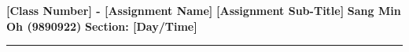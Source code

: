 \documentclass[12pt]{article}
\begin{document}
\begin{flushleft}
{{\Large\textbf{[Class Number] - [Assignment Name]}}\newline
{\large\textbf{[Assignment Sub-Title]}}\newline
\vspace{-7pt}\newline
{\large\textbf{Sang Min Oh (9890922)}}\newline
{\large\textbf{Section: [Day/Time]\vspace{-5pt}}}\newline}
\rule{7in}{0.4pt}\vspace{-6pt}
\end{flushleft}



\end{document}
